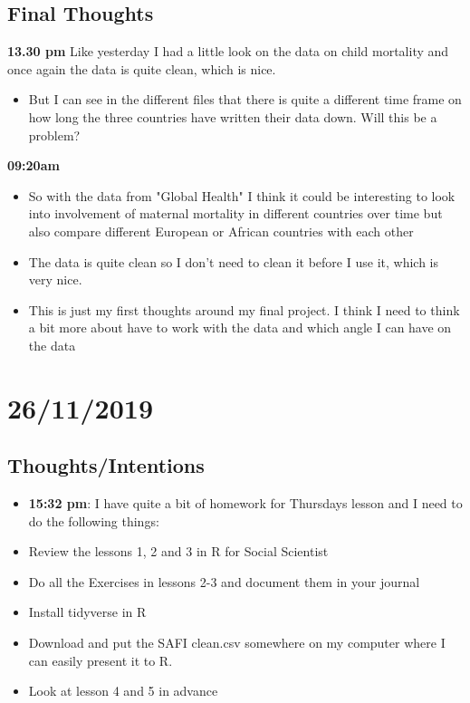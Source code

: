\documentclass{article}
\begin{document}
\subsection{Final Thoughts}
\textbf{13.30 pm} Like yesterday I had a little look on the data on child mortality and once again the data is quite clean, which is nice. 
\begin{itemize}
    \item But I can see in the different files that there is quite a different time frame on how long the three countries have written their data down. Will this be a problem? 
\end{itemize}

\textbf{09:20am}
\begin{itemize}
    \item So with the data from "Global Health" I think it could be interesting to look into involvement of maternal mortality in different countries over time but also compare different European or African countries with each other  
    \item The data is quite clean so I don't need to clean it before I use it, which is very nice.
    \item This is just my first thoughts around my final project. I think I need to think a bit more about have to work with the data and which angle I can have on the data
\end{itemize}\bigskip


\section{26/11/2019}
\subsection{Thoughts/Intentions}
\begin{itemize}
    \item \textbf{15:32 pm}:  I have quite a bit of homework for Thursdays lesson and I need to do the following things: 
    \item Review the lessons 1, 2 and 3 in R for Social Scientist
    \item Do all the Exercises in lessons 2-3 and document them in your journal 
    \item Install tidyverse in R 
    \item Download and put the SAFI clean.csv somewhere on my computer where I can easily present it to R. 
    \item Look at lesson 4 and 5 in advance
\end{itemize}
\end{document}
